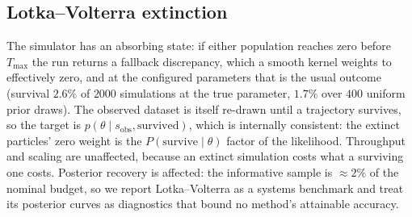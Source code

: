 \documentclass[10pt]{article}
\theoremstyle{plain}
\theoremstyle{definition}
\begin{document}
\subsection{Lotka--Volterra extinction}
The simulator has an absorbing state: if either population reaches zero before $T_{\max}$ the run returns a fallback discrepancy, which a smooth kernel weights to effectively zero, and at the configured parameters that is the usual outcome (survival $2.6\%$ of $2000$ simulations at the true parameter, $1.7\%$ over $400$ uniform prior draws). The observed dataset is itself re-drawn until a trajectory survives, so the target is $p(\theta \mid s_{\mathrm{obs}}, \text{survived})$, which is internally consistent: the extinct particles' zero weight is the $P(\text{survive}\mid\theta)$ factor of the likelihood. Throughput and scaling are unaffected, because an extinct simulation costs what a surviving one costs. Posterior recovery is affected: the informative sample is ${\approx}2\%$ of the nominal budget, so we report Lotka--Volterra as a systems benchmark and treat its posterior curves as diagnostics that bound no method's attainable accuracy.
\end{document}
